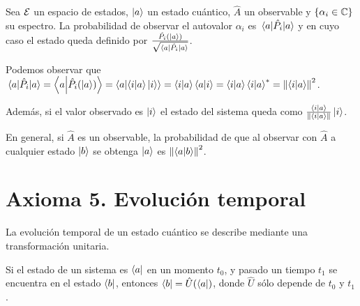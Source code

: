 \begin{proposition}
	Sea $\mathcal{E}$ un espacio de estados, $\ket{a}$ un estado cuántico, $\hat{A}$ un observable y $\qty{\alpha_i\in\mathbb{C}}$ su espectro.
	La probabilidad de observar el autovalor $\alpha_i$ es $\ev{\hat{P_i}}{a}$ y en cuyo caso el estado queda definido por $\frac{\hat{P_i}(\ket{a})}{\sqrt {\ev{\hat{P_i}}{a}}}$.
\end{proposition}

Podemos observar que $\ev{\hat{P}_i}{a}=\braket{a}{\hat{P}_i(\ket{a})}=\braket{a}{\braket{i}{a}\ket{i}}=\braket{i}{a}\braket{a}{i}=\braket{i}{a}\braket{i}{a}^*=\norm{\braket{i}{a}}^2$.

Además, si el valor observado es $\ket{i}$ el estado del sistema queda como $\frac{\braket{i}{a}}{\norm{\braket{i}{a}}}\ket{i}$.

En general, si $\hat{A}$ es un observable, la probabilidad de que al observar con $\hat{A}$ a cualquier estado $\ket{b}$ se obtenga $\ket{a}$ es $\norm{\braket{a}{b}}^2$.

\section{Axioma 5. Evolución temporal}\label{sec:axioma-5.-evolucion-temporal}
\begin{definition}[Axioma 5]
	La evolución temporal de un estado cuántico se describe mediante una transformación unitaria.
\end{definition}

Si el estado de un sistema es $\bra{a}$ en un momento $t_0$, y pasado un tiempo $t_1$ se encuentra en el estado $\bra{b}$, entonces $\bra{b}=\hat{U}(\bra{a})$, donde $\hat{U}$ sólo depende de $t_0$ y $t_1$.

